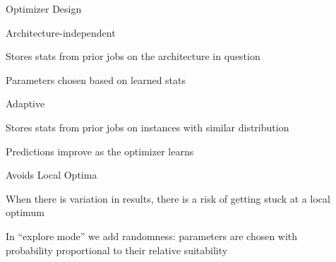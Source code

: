 \documentclass[final]{beamer}
\begin{document}
{\begin{frame}{}
\begin{center}
\begin{columns}[t]
\begin{column}{0.32\textwidth}

\vspace{1.2cm}

   
\end{column}

\begin{column}{0.32\textwidth}
 
    \begin{block}{\huge Optimizer Design}
\vspace{.5cm}


\begin{itemize}{\Large
\item Architecture-independent
\begin{itemize} {\Large
\item Stores stats from prior jobs on the architecture in question
\item Parameters chosen based on learned stats
}
\end{itemize}
\vspace{.5cm}

\item Adaptive
\begin{itemize} {\Large
\item Stores stats from prior jobs on instances with similar distribution
\item Predictions improve as the optimizer learns
}
\end{itemize}
\vspace{.5cm}

\item Avoids Local Optima
\begin{itemize} {\Large
\item When there is variation in results, there is a risk of getting stuck at a local optimum
\item In ``explore mode'' we add randomness: parameters are chosen with probability proportional to their relative suitability
}
	\end{itemize}}
\end{itemize}

\vspace{.7cm}


\end{block}
\end{column}
\end{columns}
\end{center}
\end{frame}}
\end{document}
